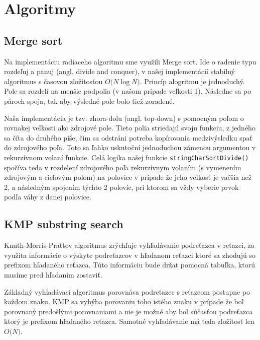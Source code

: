 \documentclass[12pt,a4paper,titlepage,final]{article}
\newcommand{\BigO}[1]{\ensuremath{O\bigl(#1\bigr)}}
\begin{document}
\section{Algoritmy} \label{Algoritmy}

\subsection{Merge sort}
Na implementáciu radiaceho algoritmu sme využili Merge sort. Ide o radenie
 typu rozdeľuj a panuj (angl. divide and conquer), v našej implementácií stabilný
 algoritmus s časovou zložitosťou \BigO{N \log{N}}. Princíp alogritmu je jednoduchý.
 Pole sa rozdelí na menšie podpolia (v našom prípade veľkosti 1). Následne sa
 po pároch spoja, tak aby výsledné pole bolo tiež zoradené.

Naša implementácia je tzv. zhora-dolu (angl. top-down) s pomocným poľom o
 rovnakej veľkosti ako zdrojové pole. Tieto polia striedajú svoju funkciu, z
 jedného sa číta do druhého píše, čím sa odstráni potreba kopírovania
 medzivýsledku spať do zdrojového poľa. Toto sa ľahko uskutoční jednoduchou
 zámenou argumentou v rekurzívnom volaní funkcie. Celá logika našej funkcie
 \texttt{stringCharSortDivide()} spočíva teda v rozdelení zdrojového poľa rekurzívnym
 volaním (s vymenením zdrojovým a cieľovým poľom) na polovice v prípade že jeho
 veľkosť je vačšia než 2, a následným spojením týchto 2 polovíc, pri ktorom sa
 vždy vyberie prvok podľa váhy z danej polovice.


\subsection{KMP substring search}
Knuth-Morris-Prattov algoritmus zrýchľuje vyhľadávanie podreťazca v reťazci, za
 využita informácie o výskyte podreťazcov v hľadanom reťazci ktoré sa
 zhodujú so prefixom hľadaného reťazca. Túto informáciu bude držat pomocná
 tabuľka, ktorú musíme pred hľadaním zostaviť.

Základný vyhľadávací algoritmus porovnáva podreťazec s reťazcom postupne po
 každom znaku. KMP sa vyhýba porovaniu toho istého znaku v prípade že bol
 porovnaný predošlými porovnaniami a nie je možné aby bol súčasťou podreťazca
 ktorý je prefixom hľadaného reťazca. Samotné vyhľadávanie má teda zložitosť
 len \BigO{N}.
\end{document}
